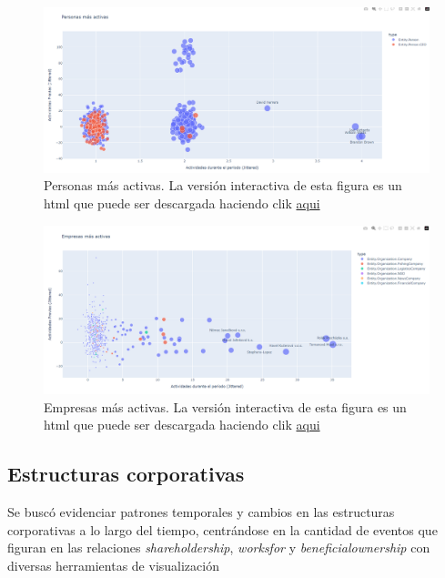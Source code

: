 \documentclass[11pt,spanish,a4paper]{article}
\begin{document}
\begin{figure}[H]
    \centering
    \includegraphics[width=0.7\linewidth]{graphs/ejercicio_1_2.png}
    \caption{Personas más activas. 
    La versión interactiva de esta figura es un html que puede ser descargada haciendo clik \href{https://github.com/bettachini/visualizacion/blob/main/vast2024/reporte/graphs/scatter_plot_degree_in_vs_out_period_persons_jitter.html.}{aqui}
    }
    \label{fig:personas_activas}
\end{figure}


\begin{figure}[H]
    \centering
    \includegraphics[width=0.9\linewidth]{graphs/ejercicio_1_1.png}
    \caption{Empresas más activas. La versión interactiva de esta figura es un html que puede ser descargada haciendo clik \href{https://github.com/bettachini/visualizacion/blob/main/vast2024/reporte/graphs/scatter_plot_degree_in_vs_out_period_companies_jitter.html}{aqui}}
    \label{fig:empresas_activas}
\end{figure}


\subsection{Estructuras corporativas}

Se buscó evidenciar patrones temporales y cambios en las estructuras corporativas a lo largo del tiempo, centrándose en la cantidad de eventos que figuran en las relaciones \emph{shareholdership}, \emph{worksfor} y \emph{beneficialownership} con diversas herramientas de visualización
\end{document}
